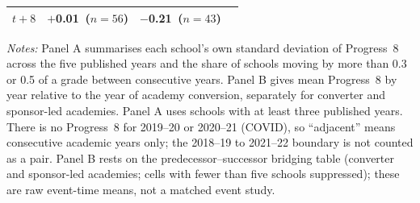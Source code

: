 \begin{table}[htbp]
\begin{tabular}{lrrr}
$t+8$ & $+$0.01 \,($n=56$) & $-$0.21 \,($n=43$) & \\
\bottomrule
\end{tabular}
\begin{minipage}{\linewidth}
\smallskip
\footnotesize\textit{Notes:} Panel A summarises each school's own standard deviation of Progress~8 across the five published years and the share of schools moving by more than 0.3 or 0.5 of a grade between consecutive years. Panel B gives mean Progress~8 by year relative to the year of academy conversion, separately for converter and sponsor-led academies. Panel A uses schools with at least three published years.
There is no Progress~8 for 2019--20 or 2020--21 (COVID), so ``adjacent'' means
consecutive academic years only; the 2018--19 to 2021--22 boundary is not counted as a
pair. Panel B rests on the predecessor--successor bridging table (converter and
sponsor-led academies; cells with fewer than five schools suppressed); these are raw
event-time means, not a matched event study. 
\end{minipage}
\end{table}

